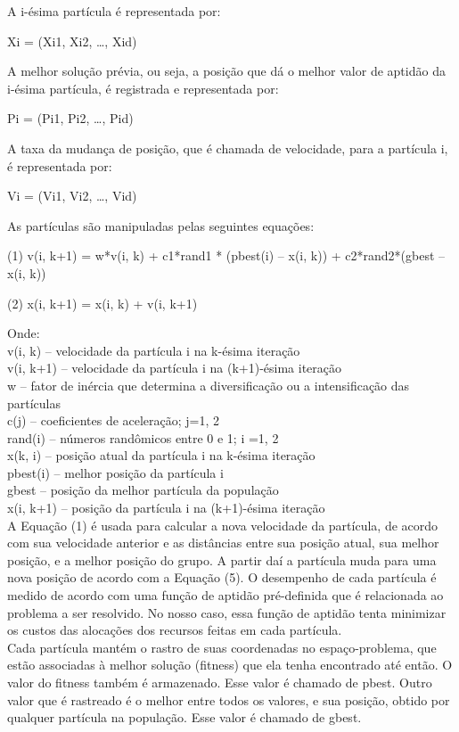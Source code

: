 \documentclass[a4paper,10pt, draft]{article}
\begin{document}
A i-ésima partícula é representada por:

Xi = (Xi1, Xi2, …, Xid)

A melhor solução prévia, ou seja, a posição que dá o melhor valor de aptidão da i-ésima partícula, é registrada e representada por:

Pi = (Pi1, Pi2, …, Pid)

A taxa da mudança de posição, que é chamada de velocidade, para a partícula i, é representada por:

Vi = (Vi1, Vi2, …, Vid)

As partículas são manipuladas pelas seguintes equações:

(1) v(i, k+1) = w*v(i, k) + c1*rand1 * (pbest(i) – x(i, k)) + c2*rand2*(gbest – x(i, k))


(2) x(i, k+1) = x(i, k) + v(i, k+1)


Onde:\\

v(i, k) – velocidade da partícula i na k-ésima iteração\\
v(i, k+1) – velocidade da partícula i na (k+1)-ésima iteração\\
w – fator de inércia que determina a diversificação ou a intensificação das partículas\\
c(j) – coeficientes de aceleração; j=1, 2\\
rand(i) – números randômicos entre 0 e 1; i =1, 2\\
x(k, i) – posição atual da partícula i na k-ésima iteração\\
pbest(i) – melhor posição da partícula i\\
gbest – posição da melhor partícula da população\\
x(i, k+1) – posição da partícula i na (k+1)-ésima iteração\\

A Equação (1) é usada para calcular a nova velocidade da partícula, de acordo com sua velocidade 
anterior e as distâncias entre sua posição atual, sua melhor posição, e a melhor posição do grupo. 
A partir daí a partícula muda para uma nova posição de acordo com a Equação (5). O desempenho de cada 
partícula é medido de acordo com uma função de aptidão pré-definida que é relacionada ao problema a ser 
resolvido. No nosso caso, essa função de aptidão tenta minimizar os custos das alocações dos 
recursos feitas em cada partícula.\\

Cada partícula mantém o rastro de suas coordenadas no espaço-problema, que estão associadas à 
melhor solução (fitness) que ela tenha encontrado até então. O valor do fitness também é armazenado. 
Esse valor é chamado de pbest. Outro valor que é rastreado é o melhor entre todos os valores, e sua posição, 
obtido por qualquer partícula na população. Esse valor é chamado de gbest.\\
\end{document}

